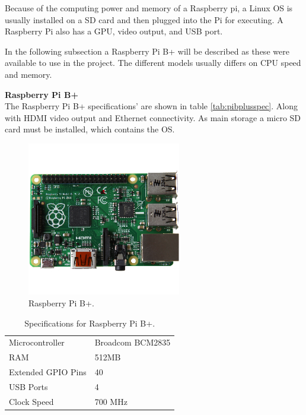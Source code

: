 Because of the computing power and memory of a Raspberry pi, a Linux OS is usually installed on a SD card and then plugged into the Pi for executing. A Raspberry Pi also has a GPU, video output, and USB port.

In the following subsection a Raspberry Pi B+ will be described as these were available to use in the project. The different models usually differs on CPU speed and memory.

\textbf{Raspberry Pi B+}\\
The Raspberry Pi B+ specifications' are shown in table \ref{tab:pibplusspec}. Along with HDMI video output and Ethernet connectivity. As main storage a micro SD card must be installed, which contains the OS.

\begin{figure}[H]
\centering
\includegraphics[width=0.6\textwidth]{chapters/analysis/figs/raspberry-pi-model-b-plus.png}
\caption{Raspberry Pi B+\cite{pibplus}.}
\label{fig:pibplus}
\end{figure}

\begin{table}[H]
\centering
\begin{tabular}{| l | l |}
\hline
Microcontroller & Broadcom BCM2835\\
RAM & 512MB\\
Extended GPIO Pins & 40\\
USB Ports & 4\\
Clock Speed & 700 MHz\\
\hline
\end{tabular}
\caption{Specifications for Raspberry Pi B+\cite{pispecs}.}
\end{table}
\label{tab:pibplusspec}
